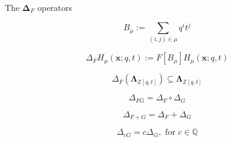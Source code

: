 \documentclass[12pt]{amsart}
\begin{document}
\vspace{-10pt}
\begin{mdframed}[linecolor=cyan!20,linewidth=3pt,innertopmargin=8pt]
	\begin{minipage}[t]{5cm}
		\begin{bf}The $\bm {\Delta}_F$ operators\end{bf}
		 \begin{equation} B_\mu:=\sum_{(i,j)\in\mu}q^it^j
		\end{equation}
	\end{minipage}
	\begin{minipage}[t]{8cm}
		\begin{equation} \Delta_FH_\mu(\bm{x};q,t):=F[B_\mu]H_\mu(\bm{x};q,t)
		\end{equation}
	\end{minipage}
	\begin{minipage}[t]{6cm}
		\begin{equation}\Delta_F(\mathbf{\Lambda}_{\mathbb{Z}[q,t]})\subseteq\mathbf{\Lambda}_{\mathbb{Z}[{q,t}]}
		\end{equation}
	\end{minipage}

	\begin{minipage}[t]{7cm}
		\begin{equation}\Delta_{FG}=\Delta_F\circ\Delta_G
		\end{equation}
	\end{minipage}
	\begin{minipage}[t]{6cm}
		\begin{equation}\Delta_{F+G}=\Delta_F+\Delta_G
		\end{equation}
	\end{minipage}
	\begin{minipage}[t]{6cm}
		\begin{equation}\Delta_{cG}=c\Delta_G, \text{ for } c \in \mathbb{Q}\end{equation}
	\end{minipage}

\end{mdframed}
\end{document}
